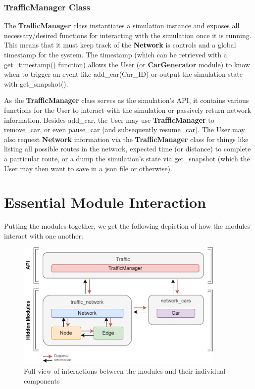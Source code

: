 \subsubsection{TrafficManager Class}

\par The \textbf{TrafficManager} class instantiates a simulation instance and exposes all necessary/desired functions for interacting with the simulation once it is running.  This means that it must keep track of the \textbf{Network} is controls and a global timestamp for the system.  The timestamp (which can be retrieved with a get\_timestamp() function) allows the User (or \textbf{CarGenerator} module) to know when to trigger an event like add\_car(Car\_ID) or output the simulation state with get\_snapshot(). \\

\par As the \textbf{TrafficManager} class serves as the simulation's API, it contains various functions for the User to interact with the simulation or passively return network information.  Besides add\_car, the User may use \textbf{TrafficManager} to remove\_car, or even pause\_car (and subsequently resume\_car).  The User may also request \textbf{Network} information via the \textbf{TrafficManager} class for things like listing all possible routes in the network, expected time (or distance) to complete a particular route, or a dump the simulation's state via get\_snapshot (which the User may then want to save in a json file or otherwise).


\section{Essential Module Interaction}

\par Putting the modules together, we get the following depiction of how the modules interact with one another:

\begin{figure}[H]
    \centering
	\includegraphics[width=0.9\textwidth]{tex files/Figures/detailed_essentials.png}
	\caption[Software Interaction:  Full View]{Full view of interactions between the modules and their individual components}
	\label{fig:interactions_detailed}
\end{figure}

